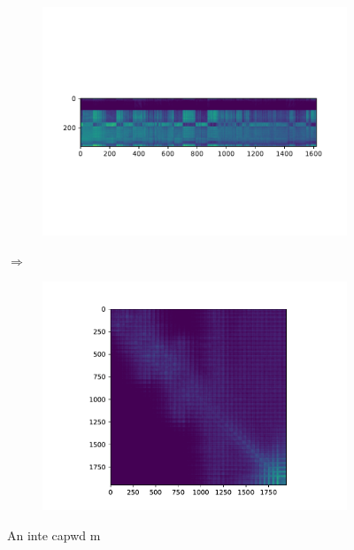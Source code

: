 \begin{figure}
\centering
\begin{subfigure}{0.3\linewidth}
\centering
\includegraphics[scale=0.6]{Pics/CISDENSE}
\caption{}
\end{subfigure}
$\Longrightarrow$
\begin{subfigure}{0.6\linewidth}
\centering
\includegraphics[scale=0.6]{Pics/CIS}
\caption{}
\end{subfigure}
\caption{An inte capwd m}
\end{figure}






